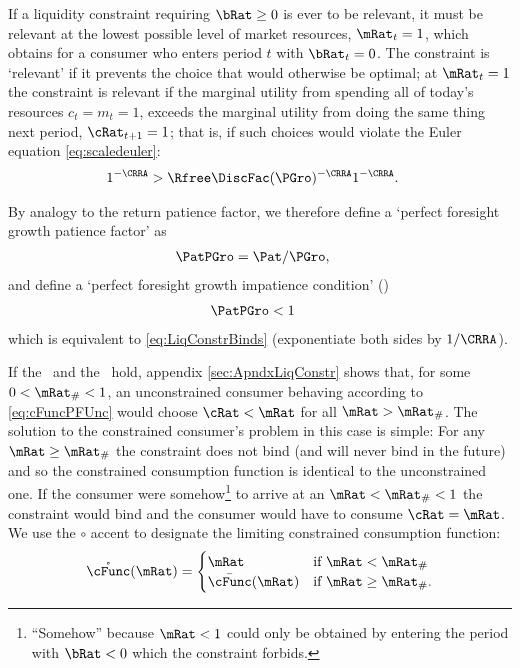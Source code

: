 \documentclass[./BufferStockTheory.tex]{subfiles}
\begin{document}
If a liquidity constraint requiring $\bRat \geq 0$ is ever to be relevant, it must be
relevant at the lowest possible level of market resources,
$\mRat_{t}=1$, which obtains for a consumer who enters period $t$ with
$\bRat_{t}=0$.  The constraint is `relevant' if
it prevents the choice that would otherwise be optimal; at
$\mRat_{t}=1$ the constraint is relevant if the marginal utility from spending all of today's
resources $c_{t}=m_{t}=1$, exceeds the marginal utility from
doing the same thing next period, $\cRat_{t+1}=1$; that is, if such
choices would violate the Euler equation \eqref{eq:scaledeuler}:
\begin{align}
    1^{-\CRRA}  & > \Rfree \DiscFac (\PGro)^{-\CRRA}1^{-\CRRA}  \label{eq:LiqConstrBinds}.
\end{align}

\hypertarget{PFGIC}{}
By analogy to the return patience factor, we therefore define a `perfect
foresight growth patience factor' as
\begin{align}
  \PatPGro  & = {\Pat}/\PGro,  \label{eq:PFGPF}
\end{align}
and define a `perfect foresight growth impatience condition' (\PFGIC)
\begin{align}
  \label{eq:PFGIC}
  \PatPGro &  < 1
\end{align}
which is equivalent to \eqref{eq:LiqConstrBinds} (exponentiate both
sides by $1/\CRRA$).

If the \RIC~and the \FHWC~hold, appendix \ref{sec:ApndxLiqConstr} shows
that, for some $0 < \mRat_{\#} < 1$, an unconstrained consumer behaving according to
\eqref{eq:cFuncPFUnc} would choose $\cRat < \mRat$ for all $\mRat >
\mRat_{\#}$.  The solution to the
constrained consumer's problem in this case is simple: For any $\mRat
\geq \mRat_{\#}$ the constraint does not bind (and will never bind in
the future) and so the constrained consumption function is identical
to the unconstrained one.  If the consumer were somehow\footnote{``Somehow'' because $\mRat<1$ could only be
obtained by entering the period with $\bRat < 0$ which the constraint
forbids.}
to arrive at an $\mRat < \mRat_{\#} < 1$ the constraint would bind and
the consumer would have to consume $\cRat=\mRat$.  We use the $\circ$ accent to designate the limiting
constrained consumption function:
\begin{equation}
\mathring{\cFunc}(\mRat)=
\begin{cases}
 \mRat & \text{if $\mRat < \mRat_{\#}$} \\
 \bar{\cFunc}(\mRat)  & \text{if $\mRat \geq \mRat_{\#}$.}
\end{cases}
\end{equation}
\end{document}
